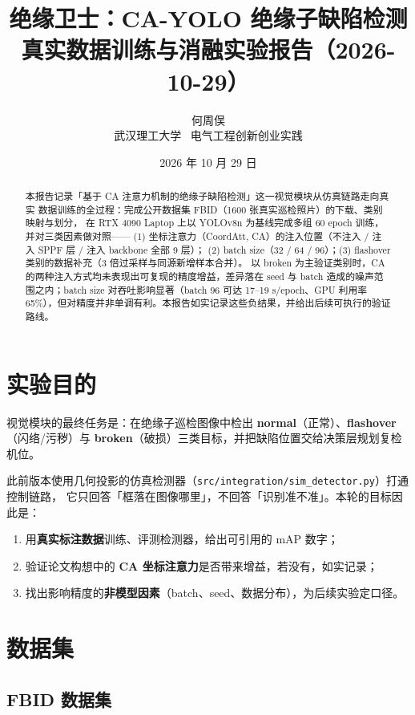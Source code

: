 \documentclass[UTF8,a4paper,11pt]{ctexart}
\title{\textbf{绝缘卫士：CA-YOLO 绝缘子缺陷检测}\\[0.4em]
\large 真实数据训练与消融实验报告（2026-10-29）}
\author{何周俣\\武汉理工大学 \, 电气工程创新创业实践}
\date{2026 年 10 月 29 日}
\begin{document}
\maketitle

\begin{abstract}
\noindent 本报告记录「基于 CA 注意力机制的绝缘子缺陷检测」这一视觉模块从仿真链路走向真实
数据训练的全过程：完成公开数据集 FBID（1600 张真实巡检照片）的下载、类别映射与划分，
在 RTX 4090 Laptop 上以 YOLOv8n 为基线完成多组 60 epoch 训练，并对三类因素做对照——
(1) 坐标注意力（CoordAtt, CA）的注入位置（不注入 / 注入 SPPF 层 / 注入 backbone 全部 9 层）；
(2) batch size（32 / 64 / 96）；(3) flashover 类别的数据补充（3 倍过采样与同源新增样本合并）。
以 broken 为主验证类别时，CA 的两种注入方式均未表现出可复现的精度增益，差异落在 seed 与
batch 造成的噪声范围之内；batch size 对吞吐影响显著（batch 96 可达 17--19 s/epoch、GPU
利用率 65\%），但对精度并非单调有利。本报告如实记录这些负结果，并给出后续可执行的验证路线。
\end{abstract}

\section{实验目的}

视觉模块的最终任务是：在绝缘子巡检图像中检出 \textbf{normal}（正常）、\textbf{flashover}
（闪络/污秽）与 \textbf{broken}（破损）三类目标，并把缺陷位置交给决策层规划复检机位。

此前版本使用几何投影的仿真检测器（\texttt{src/integration/sim\_detector.py}）打通控制链路，
它只回答「框落在图像哪里」，不回答「识别准不准」。本轮的目标因此是：

\begin{enumerate}[label=(\arabic*)]
  \item 用\textbf{真实标注数据}训练、评测检测器，给出可引用的 mAP 数字；
  \item 验证论文构想中的 \textbf{CA 坐标注意力}是否带来增益，若没有，如实记录；
  \item 找出影响精度的\textbf{非模型因素}（batch、seed、数据分布），为后续实验定口径。
\end{enumerate}

\section{数据集}

\subsection{FBID 数据集}
\end{document}
